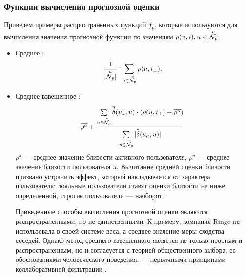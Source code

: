 
\subsubsection{Функции вычисления прогнозной оценки}
Приведем примеры распространенных функций $f_p$, которые используются для
вычисления значения прогнозной функции по значениям $\rho(u, i), u \in {\overset{u}{\mathcal{N}_p}}$.
\begin{itemize}
  \item Среднее  \cite{surveyCf}:
  \begin{equation}
	\label{middle-pred}
    \frac{1}{|{\overset{u}{\mathcal{N}_p}}|} \cdot \sum \limits_{u \in {\overset{u}{\mathcal{N}_p}}} \rho(u,i_{\bot}).
  \end{equation}
  \item Среднее взвешенное \cite{surveyCf}:
  \begin{equation}
	  \label{weighted-pred}
    \overline{\rho^a} +
    \frac{ \sum \limits_{u \in {\overset{u}{\mathcal{N}_p}}} {\overset{u}{\mathcal{\delta}}}(u_a,u) \cdot (\rho(u,i_{\bot}) -
	  \overline{\rho^u}) }
{ \sum \limits_{u \in {\overset{u}{\mathcal{N}_p}}} | {\overset{u}{\mathcal{\delta}}}(u_a,u) | }
  \end{equation}
  $\overline{\rho^a}$ --- среднее значение близости активного пользователя,
		$\overline{\rho^u}$ --- среднее значение близости пользователя $u$.
Вычитание средней оценки близости призвано устранить эффект,
который накладывается от характера пользователя:
		лояльные пользователи ставят оценки близости не ниже определенной,
строгие пользователи --- наоборот \cite{norm, rs-handbook}.

Приведенные способы вычисления прогнозной оценки являются распространенными, но не единственными.
К примеру, компания Ringo \cite{ringo} не использовала в своей системе веса,
а среднее значение меры сходства соседей. Однако
метод среднего взвешенного является не только простым и распространенным,
но и согласуется с
теорией общественного выбора, ее обоснованиями человеческого поведения, ---
первичными принципами коллаборативной фильтрации  \cite{cfrs,bellcore}.
\end{itemize}

